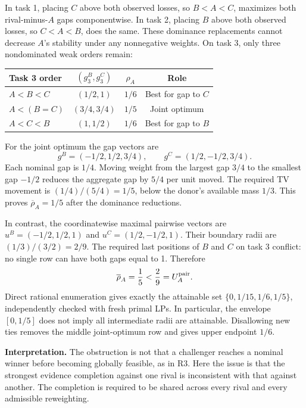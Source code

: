 \documentclass[11pt,a4paper]{article}
\newcommand{\rhi}{\overline{\rho}}
\begin{document}
In task 1, placing $C$ above both observed losses, so $B<A<C$, maximizes both
rival-minus-$A$ gaps componentwise. In task 2, placing $B$ above both observed
losses, so $C<A<B$, does the same. These dominance replacements cannot decrease
$A$'s stability under any nonnegative weights. On task 3, only three nondominated
weak orders remain:
\begin{center}
\begin{tabular}{lccc}\toprule
Task 3 order & $(g^B_3,g^C_3)$ & $\rho_A$ & Role\\\midrule
$A<B<C$ & $(1/2,1)$ & $1/6$ & Best for gap to $C$\\
$A<(B=C)$ & $(3/4,3/4)$ & $1/5$ & Joint optimum\\
$A<C<B$ & $(1,1/2)$ & $1/6$ & Best for gap to $B$\\\bottomrule
\end{tabular}
\end{center}
For the joint optimum the gap vectors are
\begin{equation}
g^B=(-1/2,1/2,3/4),\qquad g^C=(1/2,-1/2,3/4).
\end{equation}
Each nominal gap is $1/4$. Moving weight from the largest gap $3/4$ to the
smallest gap $-1/2$ reduces the aggregate gap by $5/4$ per unit moved. The required
TV movement is $(1/4)/(5/4)=1/5$, below the donor's available mass $1/3$.
This proves $\rhi_A=1/5$ after the dominance reductions.

In contrast, the coordinatewise maximal pairwise vectors are
$u^B=(-1/2,1/2,1)$ and $u^C=(1/2,-1/2,1)$. Their boundary radii are
$(1/3)/(3/2)=2/9$. The required last positions of $B$ and $C$ on task 3 conflict:
no single row can have both gaps equal to 1. Therefore
\begin{equation}
\rhi_A=\frac15 < \frac29=U_A^{\rm pair}.
\end{equation}
Direct rational enumeration gives exactly the attainable set
$\{0,1/15,1/6,1/5\}$, independently checked with fresh primal LPs. In particular,
the envelope $[0,1/5]$ does not imply all intermediate radii are attainable.
Disallowing new ties removes the middle joint-optimum row and gives upper
endpoint $1/6$.

\textbf{Interpretation.} The obstruction is not that a challenger reaches a
nominal winner before becoming globally feasible, as in R3. Here the issue is
that the strongest evidence completion against one rival is inconsistent with
that against another. The completion is required to be shared across every
rival and every admissible reweighting.
\end{document}
